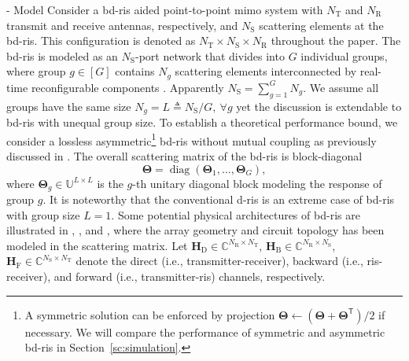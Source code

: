 \documentclass[journal]{IEEEtran}
\DeclareMathOperator{\diag}{diag}
\begin{document}
\begin{section}{- Model}
	Consider a \gls{bd}-\gls{ris} aided point-to-point \gls{mimo} system with $N_\mathrm{T}$ and $N_\mathrm{R}$ transmit and receive antennas, respectively, and $N_\mathrm{S}$ scattering elements at the \gls{bd}-\gls{ris}.
	This configuration is denoted as $N_\mathrm{T} \times N_\mathrm{S} \times N_\mathrm{R}$ throughout the paper.
	The \gls{bd}-\gls{ris} is modeled as an $N_\mathrm{S}$-port network \cite{Ivrlac2010} that divides into $G$ individual groups, where group $g \in [G]$ contains $N_g$ scattering elements interconnected by real-time reconfigurable components \cite{Shen2020a}.
	Apparently $N_\mathrm{S} = \sum_{g=1}^G N_g$.
	We assume all groups have the same size $N_g = L \triangleq N_\mathrm{S} / G, \ \forall g$ yet the discussion is extendable to \gls{bd}-\gls{ris} with unequal group size.
	To establish a theoretical performance bound, we consider a lossless asymmetric\footnote{A symmetric solution can be enforced by projection $\mathbf{\Theta} \gets (\mathbf{\Theta} + \mathbf{\Theta}^\mathsf{T})/2$ if necessary. We will compare the performance of symmetric and asymmetric \gls{bd}-\gls{ris} in Section~\ref{sc:simulation}.} \gls{bd}-\gls{ris} without mutual coupling as previously discussed in \cite{Li2023b,Li2023c,Bartoli2023}.
	The overall scattering matrix of the \gls{bd}-\gls{ris} is block-diagonal
	\begin{equation}
		\mathbf{\Theta} = \diag(\mathbf{\Theta}_1,\ldots,\mathbf{\Theta}_G),
		\label{eq:bd_ris}
	\end{equation}
	where $\mathbf{\Theta}_g \in \mathbb{U}^{L \times L}$ is the $g$-th unitary diagonal block modeling the response of group $g$.
	It is noteworthy that the conventional \gls{d}-\gls{ris} is an extreme case of \gls{bd}-\gls{ris} with group size $L=1$.
	Some potential physical architectures of \gls{bd}-\gls{ris} are illustrated in \cite[Fig. 3]{Shen2020a}, \cite[Fig. 5]{Li2023c}, and \cite[Fig. 2]{Nerini2024}, where the
	array geometry and
	circuit topology has been modeled in the scattering matrix.
	Let $\mathbf{H}_\mathrm{D} \in \mathbb{C}^{N_\mathrm{R} \times N_\mathrm{T}}$, $\mathbf{H}_\mathrm{B} \in \mathbb{C}^{N_\mathrm{R} \times N_\mathrm{S}}$, $\mathbf{H}_\mathrm{F} \in \mathbb{C}^{N_\mathrm{S} \times N_\mathrm{T}}$ denote the direct (i.e., transmitter-receiver), backward (i.e., \gls{ris}-receiver), and forward (i.e., transmitter-\gls{ris}) channels, respectively.

\end{section}
\end{document}
